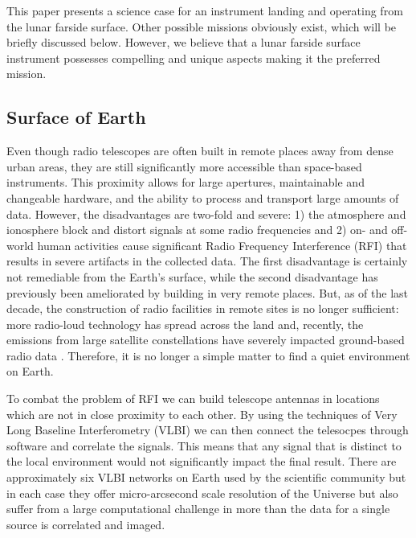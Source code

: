 This paper presents a science case for an instrument landing and operating from the lunar farside surface.  Other possible missions obviously exist, which will be briefly discussed below.
However, we believe that a lunar farside surface instrument possesses compelling and unique aspects making it the preferred mission.


\subsection{Surface of Earth}
Even though radio telescopes are often built in remote places away from dense urban areas, they are still significantly more accessible than space-based instruments. This proximity allows for large apertures, maintainable and changeable hardware, and the ability to process and transport large amounts of data. However, the disadvantages are two-fold and severe: 1) the atmosphere and ionosphere block and distort signals at some radio frequencies and 2) on- and off-world human activities cause significant Radio Frequency Interference (RFI) that results in severe artifacts in the collected data. The first disadvantage is certainly not remediable from the Earth’s surface, while the second disadvantage has previously been ameliorated by building in very remote places. But, as of the last decade, the construction of radio facilities in remote sites is no longer sufficient: more radio-loud technology has spread across the land and, recently, the emissions from large satellite constellations have severely impacted ground-based radio data \citep{di2023unintended}. Therefore, it is no longer a simple matter to find a quiet environment on Earth.

To combat the problem of RFI we can build telescope antennas in locations which are not in close proximity to each other. By using the techniques of Very Long  Baseline Interferometry (VLBI) we can then connect the telesocpes through software and correlate the signals. This means that any signal that is distinct to the local environment would not significantly impact the final result. There are approximately six VLBI networks on Earth used by the scientific community but in each case they offer micro-arcsecond scale resolution of the Universe but also suffer from a large computational challenge in more than the data for a single source is correlated and imaged. %

